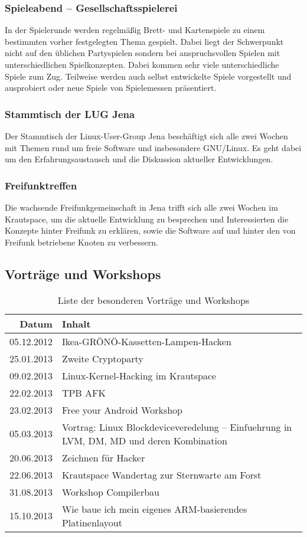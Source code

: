 \documentclass[10pt,DIV16]{scrartcl}
\begin{document}
\subsubsection{Spieleabend -- Gesellschaftsspielerei}

In der Spielerunde werden regelmäßig Brett- und Kartenspiele zu einem
bestimmten vorher festgelegten Thema gespielt. Dabei liegt der Schwerpunkt
nicht auf den üblichen Partyspielen sondern bei anspruchsvollen Spielen mit
unterschiedlichen Spielkonzepten. Dabei kommen sehr viele unterschiedliche
Spiele zum Zug. Teilweise werden auch selbst entwickelte Spiele vorgestellt
und ausprobiert oder neue Spiele von Spielemessen präsentiert.

\subsubsection{Stammtisch der LUG Jena}

Der Stammtisch der Linux-User-Group Jena beschäftigt sich alle zwei Wochen
mit Themen rund um freie Software und insbesondere GNU/Linux. Es geht dabei
um den Erfahrungsaustausch und die Diskussion aktueller Entwicklungen.

\subsubsection{Freifunktreffen}

Die wachsende Freifunkgemeinschaft in Jena trifft sich alle zwei Wochen
im Krautspace, um die aktuelle Entwicklung zu besprechen und
Interessierten die Konzepte hinter Freifunk zu erklären, sowie die
Software auf und hinter den von Freifunk betriebene Knoten zu
verbessern.

\subsection{Vorträge und Workshops}

\begin{table}[h]
\begin{tabular}{r|l}
	\textbf{Datum} & \textbf{Inhalt} \\ \hline{}
	05.12.2012 & Ikea-GRÖNÖ-Kassetten-Lampen-Hacken\\
    25.01.2013 & Zweite Cryptoparty\\
	09.02.2013 & Linux-Kernel-Hacking im Krautspace\\
	22.02.2013 & TPB AFK\\
	23.02.2013 & Free your Android Workshop\\
	05.03.2013 & Vortrag: Linux Blockdeviceveredelung -- Einfuehrung in LVM, DM, MD und deren Kombination\\
	20.06.2013 & Zeichnen für Hacker\\
	22.06.2013 & Krautspace Wandertag zur Sternwarte am Forst\\
	31.08.2013 & Workshop Compilerbau\\
	15.10.2013 & Wie baue ich mein eigenes ARM-basierendes Platinenlayout
	\end{tabular}
	\caption{Liste der besonderen Vorträge und Workshops}
\end{table}
\end{document}
